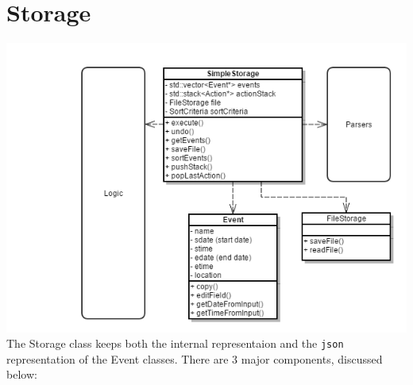 \documentclass[12pt]{extarticle}
\begin{document}
\section{Storage}
\includegraphics[width=\textwidth/2]{storage_class_diagram}\\
The Storage class keeps both the internal representaion and the \texttt{json} representation of the Event classes. There are 3 major components, discussed below:
\end{document}
